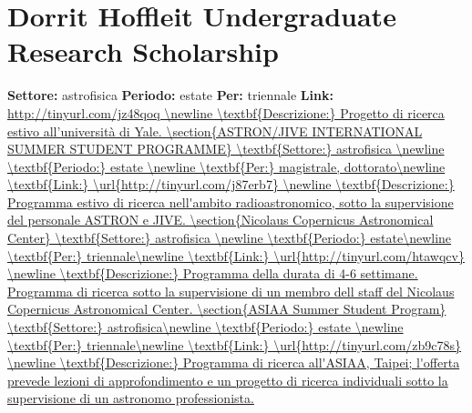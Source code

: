 \documentclass[a4paper,10pt]{article}
\begin{document}
\section{Dorrit Hoffleit Undergraduate Research Scholarship}
\textbf{Settore:} astrofisica\newline
\textbf{Periodo:} estate\newline
\textbf{Per:} triennale\newline
\textbf{Link:} \url{http://tinyurl.com/jz48qoq \newline
\textbf{Descrizione:} Progetto di ricerca estivo all’università di Yale.  

\section{ASTRON/JIVE INTERNATIONAL SUMMER STUDENT PROGRAMME}  
\textbf{Settore:} astrofisica \newline
\textbf{Periodo:} estate \newline
\textbf{Per:} magistrale, dottorato\newline
\textbf{Link:} \url{http://tinyurl.com/j87erb7} \newline
\textbf{Descrizione:} Programma estivo di ricerca nell'ambito radioastronomico, sotto la supervisione del personale ASTRON e JIVE.  

\section{Nicolaus Copernicus Astronomical Center} 
\textbf{Settore:} astrofisica \newline
\textbf{Periodo:} estate\newline
\textbf{Per:} triennale\newline
\textbf{Link:} \url{http://tinyurl.com/htawqcv} \newline
\textbf{Descrizione:} Programma della durata di 4-6 settimane. Programma di ricerca sotto la supervisione di un membro dell staff del Nicolaus Copernicus Astronomical Center.  

\section{ASIAA Summer Student Program}
\textbf{Settore:} astrofisica\newline
\textbf{Periodo:} estate \newline
\textbf{Per:} triennale\newline
\textbf{Link:} \url{http://tinyurl.com/zb9c78s} \newline
\textbf{Descrizione:} Programma di ricerca all'ASIAA, Taipei; l'offerta prevede lezioni di approfondimento e un progetto di ricerca individuali sotto la supervisione di un astronomo professionista. 

}
\end{document}
